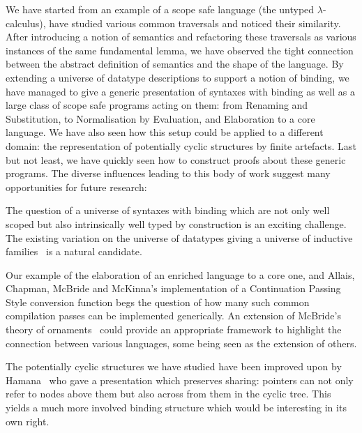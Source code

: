 We have started from an example of a scope safe language (the
untyped $\lambda$-calculus), have studied various common traversals
and noticed their similarity. After introducing a notion of semantics
and refactoring these traversals as various instances of the same
fundamental lemma, we have observed the tight connection between the
abstract definition of semantics and the shape of the language. By
extending a universe of datatype descriptions to support a notion of
binding, we have managed to give a generic presentation of syntaxes
with binding as well as a large class of scope safe programs acting
on them: from Renaming and Substitution, to Normalisation by Evaluation,
and Elaboration to a core language. We have also seen how this setup
could be applied to a different domain: the representation of potentially
cyclic structures by finite artefacts. Last but not least, we have
quickly seen how to construct proofs about these generic programs.
The diverse influences leading to this body of work suggest many
opportunities for future research:

The question of a universe of syntaxes with binding which are not only
well scoped but also intrinsically well typed by construction is an
exciting challenge. The existing variation on the universe of datatypes
giving a universe of inductive families~\cite{dybjer1994inductive}
is a natural candidate.

Our example of the elaboration of an enriched language to a core one,
and Allais, Chapman, McBride and McKinna's implementation of a
Continuation Passing Style conversion function begs the question of how
many such common compilation passes can be implemented generically.
An extension of McBride's theory of ornaments~\citeyear{mcbride2010ornamental}
could provide an appropriate framework to highlight the connection
between various languages, some being seen as the extension of others.

The potentially cyclic structures we have studied have been improved
upon by Hamana~\citeyear{Hamana2009} who gave a presentation which
preserves sharing: pointers can not only refer to nodes above them
but also across from them in the cyclic tree. This yields a much more
involved binding structure which would be interesting in its own right.
